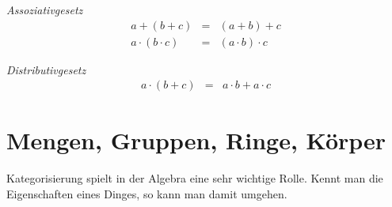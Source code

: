 \noindent \textsl{Assoziativgesetz}
\begin{eqnarray*}
a+(b+c) &=& (a+b)+c \\
a\cdot (b\cdot c) &=& (a\cdot b)\cdot c
\end{eqnarray*}

\noindent \textsl{Distributivgesetz}
\begin{eqnarray*}
a\cdot (b+c) &=& a\cdot b+ a\cdot c
\end{eqnarray*}


\chapter{Mengen, Gruppen, Ringe, Körper}

Kategorisierung spielt in der Algebra eine sehr wichtige Rolle. Kennt man die Eigenschaften eines Dinges, so kann man damit umgehen.

